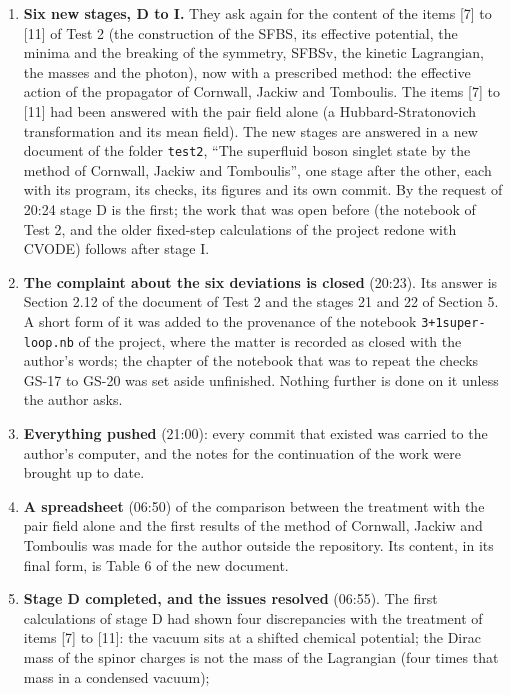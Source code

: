 \documentclass[
  10pt,
]{article}
\providecommand{\tightlist}{%
  \setlength{\itemsep}{0pt}\setlength{\parskip}{0pt}}
\begin{document}
\begin{enumerate}
\def\labelenumi{\arabic{enumi}.}
\tightlist
\item
  \textbf{Six new stages, D to I.} They ask again for the content of the
  items {[}7{]} to {[}11{]} of Test 2 (the construction of the SFBS, its
  effective potential, the minima and the breaking of the symmetry,
  SFBSv, the kinetic Lagrangian, the masses and the photon), now with a
  prescribed method: the effective action of the propagator of Cornwall,
  Jackiw and Tomboulis. The items {[}7{]} to {[}11{]} had been answered
  with the pair field alone (a Hubbard-Stratonovich transformation and
  its mean field). The new stages are answered in a new document of the
  folder \texttt{test2}, ``The superfluid boson singlet state by the
  method of Cornwall, Jackiw and Tomboulis'', one stage after the other,
  each with its program, its checks, its figures and its own commit. By
  the request of 20:24 stage D is the first; the work that was open
  before (the notebook of Test 2, and the older fixed-step calculations
  of the project redone with CVODE) follows after stage I.
\item
  \textbf{The complaint about the six deviations is closed} (20:23). Its
  answer is Section 2.12 of the document of Test 2 and the stages 21 and
  22 of Section 5. A short form of it was added to the provenance of the
  notebook \texttt{3+1super-loop.nb} of the project, where the matter is
  recorded as closed with the author's words; the chapter of the
  notebook that was to repeat the checks GS-17 to GS-20 was set aside
  unfinished. Nothing further is done on it unless the author asks.
\item
  \textbf{Everything pushed} (21:00): every commit that existed was
  carried to the author's computer, and the notes for the continuation
  of the work were brought up to date.
\item
  \textbf{A spreadsheet} (06:50) of the comparison between the treatment
  with the pair field alone and the first results of the method of
  Cornwall, Jackiw and Tomboulis was made for the author outside the
  repository. Its content, in its final form, is Table 6 of the new
  document.
\item
  \textbf{Stage D completed, and the issues resolved} (06:55). The first
  calculations of stage D had shown four discrepancies with the
  treatment of items {[}7{]} to {[}11{]}: the vacuum sits at a shifted
  chemical potential; the Dirac mass of the spinor charges is not the
  mass of the Lagrangian (four times that mass in a condensed vacuum);

\end{enumerate}
\end{document}
